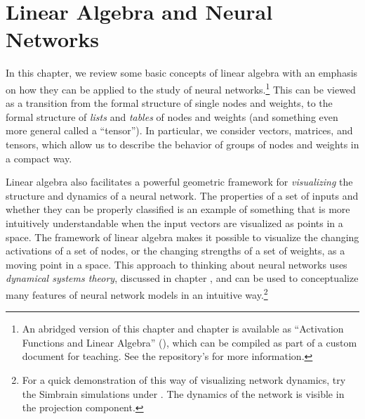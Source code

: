 \chapter{Linear Algebra and Neural Networks}\label{ch_linear_algebra}



In this chapter, we review some basic concepts of linear algebra with an 
emphasis on how they can be applied to the study of neural networks.\footnote{An abridged version of this chapter and chapter  is available as ``Activation Functions and Linear Algebra'' (), which can be compiled as part of a custom document for teaching. See the repository's  for more information.} This can be viewed as a transition from the formal structure of single nodes and weights, to the formal structure of \emph{lists} and \emph{tables} of nodes and weights (and something even more general called a ``tensor''). In particular, we consider vectors, matrices, and tensors, which allow us to describe the behavior of groups of nodes and weights in a compact way.

Linear algebra also facilitates a powerful geometric framework for \emph{visualizing} the structure and dynamics of a neural network. The properties of a set of inputs and whether they can be properly classified is an example of something that is more intuitively understandable when the input vectors are visualized as points in a space. The framework of linear algebra makes it possible to visualize the changing activations of a set of nodes, or the changing strengths of a set of weights, as a moving point in a space. This approach to thinking about neural networks uses \emph{dynamical systems theory}, discussed in chapter , and can be used to conceptualize many features of neural network models in an intuitive way.\footnote{For a quick demonstration of this way of visualizing network dynamics, try the Simbrain simulations under . The dynamics of the network is visible in the projection component.}

